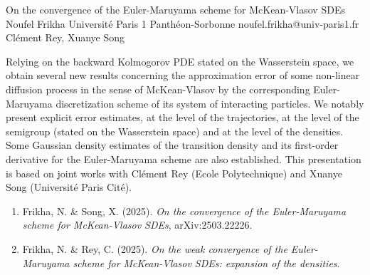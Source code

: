 \begin{talk}
  {On the convergence of the Euler-Maruyama scheme for McKean-Vlasov SDEs}%
  {Noufel Frikha}%
  {Universit\'e Paris 1 Panth\'eon-Sorbonne}%
  {noufel.frikha@univ-paris1.fr}%
  {Cl\'ement Rey, Xuanye Song}%
  
    
   
Relying on the backward Kolmogorov PDE stated on the Wasserstein space, we obtain several new results concerning the approximation error of some non-linear diffusion process in the sense of McKean-Vlasov by the corresponding Euler-Maruyama discretization scheme of its system of interacting particles. We notably present explicit error estimates, at the level of the trajectories, at the level of the semigroup (stated on the Wasserstein space) and at the level of the densities. Some Gaussian density estimates of the transition density and its first-order derivative for the Euler-Maruyama scheme are also established. This presentation is based on joint works with Cl\'ement Rey (Ecole Polytechnique) and Xuanye Song (Universit\'e Paris Cit\'e).

\medskip


\begin{enumerate}
 \item[{[1]}] Frikha, N.  \& Song, X. (2025). {\it On the convergence of the Euler-Maruyama scheme for McKean-Vlasov SDEs}, arXiv:2503.22226.
 \item[{[2]}] Frikha, N. \& Rey, C. (2025).  {\it On the weak convergence of the Euler-Maruyama scheme for McKean-Vlasov SDEs: expansion of the densities}.
\end{enumerate}


\end{talk}

